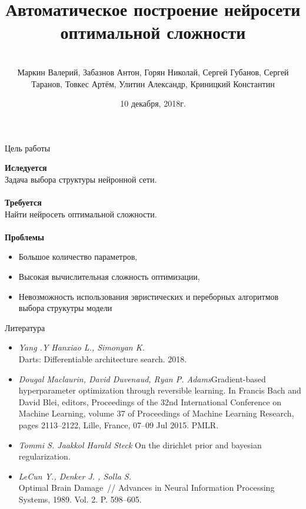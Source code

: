 \documentclass[10pt]{beamer}
\title[\hbox to 56mm{Нейросети оптимальной сложности  \hfill\insertframenumber\,/\,\inserttotalframenumber}]
{Автоматическое построение нейросети оптимальной сложности }
\author[В.\,О. Маркин, А.\,Г. Забазнов, Н.\,А. Горян, С.\,Е. Губанов, С.\,К. Таранов]{\large \\Маркин Валерий, Забазнов Антон, Горян Николай, Сергей Губанов, Сергей Таранов, Товкес Артём, Улитин Александр, Криницкий Константин}
\institute{\large
Московский физико-технический институт}
\date{\footnotesize{10 декабря, 2018г.}}
\begin{document}
\begin{frame}
\titlepage
\end{frame}
\begin{frame}{Цель работы}

{\bf Иследуется}\\
\quad
	 Задача выбора структуры нейронной сети.\\
	~\\

{\bf Требуется}\\
\quad
	Найти нейросеть оптимальной сложности.\\
	~\\

{\bf Проблемы}\\
	\begin{itemize}
		\item Большое количество параметров,
		\item Высокая вычислительная сложность оптимизации,
		\item Невозможность использования эвристических и переборных алгоритмов выбора струкутры модели
	\end{itemize}

\end{frame}

\begin{frame}{Литература}

	\begin{itemize}
		\item \textit{Yang .Y Hanxiao L., Simonyan K.}\\ Darts: Differentiable architecture search. 2018.
		\item	\textit{Dougal Maclaurin, David Duvenaud, Ryan P. Adams}Gradient-based hyperparameter optimization through reversible learning. In Francis Bach and David Blei, editors, Proceedings of the 32nd International Conference on Machine Learning, volume 37 of Proceedings of Machine Learning Research, pages 2113–2122, Lille, France, 07–09 Jul 2015. PMLR.
	\end{itemize}
	
	\begin{itemize}
		\item \textit{Tommi S. Jaakkol Harald Steck} On the dirichlet prior and bayesian regularization.
		\item \textit{LeCun Y., Denker J. , Solla S.}\\ Optimal Brain Damage~// Advances in Neural Information Processing Systems, 1989. Vol. 2. P. 598--605.	
	\end{itemize}
	
\end{frame}
\end{document}
